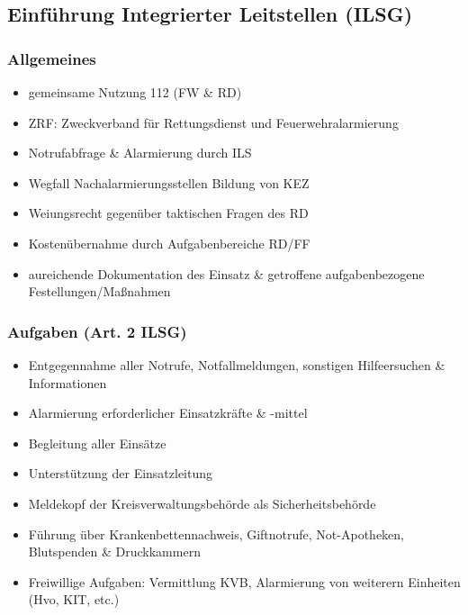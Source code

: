 \subsection{Einführung Integrierter Leitstellen (ILSG)}
\begin{normbox}{\subsubsection{Allgemeines}}
    \begin{itemize}
        \item gemeinsame Nutzung 112 (FW \& RD)
        \item ZRF: Zweckverband für Rettungsdienst und Feuerwehralarmierung
        \item Notrufabfrage \& Alarmierung durch ILS
        \item Wegfall Nachalarmierungsstellen \ra Bildung von KEZ
        \item Weiungsrecht gegenüber taktischen Fragen des RD
        \item Kostenübernahme durch Aufgabenbereiche RD/FF
        \item aureichende Dokumentation des Einsatz \& getroffene aufgabenbezogene Festellungen/Maßnahmen
    \end{itemize}
\end{normbox}
\begin{normbox}{\subsubsection{Aufgaben (Art. 2 ILSG)}}
    \begin{itemize}
        \item Entgegennahme aller Notrufe, Notfallmeldungen, sonstigen Hilfeersuchen \& Informationen
        \item Alarmierung erforderlicher Einsatzkräfte \& -mittel
        \item Begleitung aller Einsätze
        \item Unterstützung der Einsatzleitung
        \item Meldekopf der Kreisverwaltungsbehörde als Sicherheitsbehörde
        \item Führung über Krankenbettennachweis, Giftnotrufe, Not-Apotheken, Blutspenden \& Druckkammern
        \item Freiwillige Aufgaben: Vermittlung KVB, Alarmierung von weiterern Einheiten (Hvo, KIT, etc.)
    \end{itemize}
\end{normbox}
